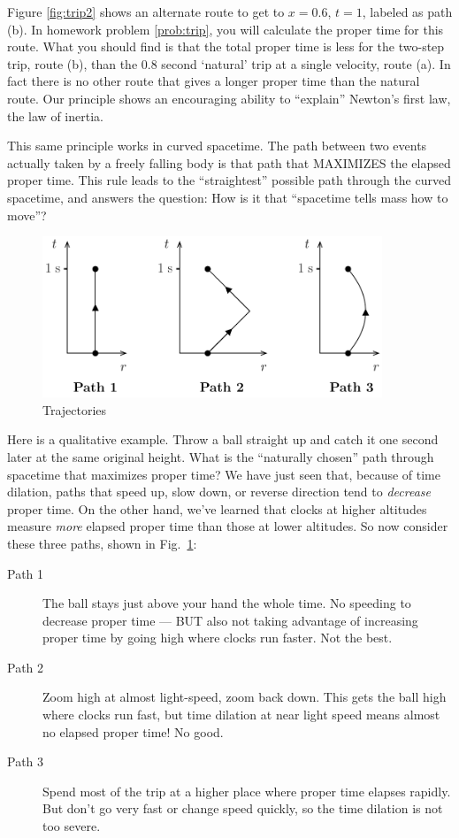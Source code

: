Figure \ref{fig:trip2} shows an alternate route to get to $x = 0.6$,
$t = 1$, labeled as path (b).  In homework problem \ref{prob:trip},
you will calculate the proper time for this route.  What you should
find is that the total proper time is less for the two-step trip,
route (b), than the 0.8 second `natural' trip at a single velocity,
route (a).  In fact there is no other route that gives a longer proper
time than the natural route.  Our principle shows an encouraging
ability to ``explain'' Newton's first law, the law of inertia.

This same principle works in curved spacetime.  The path between two
events actually taken by a freely falling body is that path that
MAXIMIZES the elapsed proper time.  This rule leads to the
``straightest'' possible path through the curved spacetime, and
answers the question:  How is it that ``spacetime tells mass how to
move''?

\begin{figure}[t]
\begin{center}
\includegraphics[width=4in]{gravity_and_geometry/trajectory.pdf}
\end{center}
\caption{Trajectories}
\label{fig:trajectories}
\end{figure}
     
Here is a qualitative example.  Throw a ball straight up and catch it
one second later at the same original height.  What is the ``naturally
chosen'' path through spacetime that maximizes proper time?  We have
just seen that, because of time dilation, paths that speed up, slow
down, or reverse direction tend to \textit{decrease} proper time.  On
the other hand, we've learned that clocks at higher altitudes measure
\textit{more} elapsed proper time than those at lower altitudes.  So
now consider these three paths, shown in Fig.~\ref{fig:trajectories}:

\begin{description}
\item[Path 1] The ball stays just above your hand the whole time.  No
  speeding to decrease proper time --- BUT also not taking advantage of
  increasing proper time by going high where clocks run faster.   Not
  the best.

\item[Path 2] Zoom high at almost light-speed, zoom back down.  This
  gets the ball high where clocks run fast, but time dilation at near
  light speed means almost no elapsed proper time!  No good.

\item[Path 3] Spend most of the trip at a higher place where proper
  time elapses rapidly.  But don't go very fast or change speed
  quickly, so the time dilation is not too severe.
\end{description}
        
